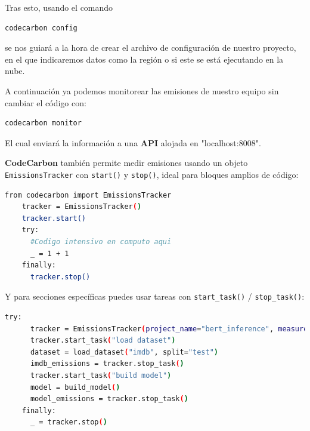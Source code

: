 \documentclass[12pt,a4paper]{report}
\begin{document}
Tras esto, usando el comando

\begin{tcolorbox}[colback=codebackground, colframe=codeborder, boxrule=0.8pt, arc=0mm, boxsep=5pt, left=5pt, right=5pt, top=5pt, bottom=5pt]
  \begin{lstlisting}[language=bash]
    codecarbon config
  \end{lstlisting}
\end{tcolorbox}

se nos guiará a la hora de crear el archivo de configuración de nuestro
proyecto, en el que indicaremos datos como la región o si este se está
ejecutando en la nube.

A continuación ya podemos monitorear las emisiones de nuestro equipo sin
cambiar el código con:

\begin{tcolorbox}[colback=codebackground, colframe=codeborder, boxrule=0.8pt, arc=0mm, boxsep=5pt, left=5pt, right=5pt, top=5pt, bottom=5pt]
  \begin{lstlisting}[language=bash]
    codecarbon monitor
  \end{lstlisting}
\end{tcolorbox}

El cual enviará la información a una \textbf{API} alojada en
"localhost:8008".

\textbf{CodeCarbon} también permite medir emisiones usando un objeto \texttt{EmissionsTracker} con \texttt{start()} y \texttt{stop()}, ideal para bloques amplios de código:

\begin{tcolorbox}[colback=codebackground, colframe=codeborder, boxrule=0.8pt, arc=0mm, boxsep=5pt, left=5pt, right=5pt, top=5pt, bottom=5pt]
  \begin{lstlisting}[language=bash]
    from codecarbon import EmissionsTracker
    tracker = EmissionsTracker()
    tracker.start()
    try:
      #Codigo intensivo en computo aqui
      _ = 1 + 1
    finally:
      tracker.stop()
  \end{lstlisting}
\end{tcolorbox}

Y para secciones específicas puedes usar tareas con \texttt{start\_task()} /
\texttt{stop\_task()}:

\begin{tcolorbox}[colback=codebackground, colframe=codeborder, boxrule=0.8pt, arc=0mm, boxsep=5pt, left=5pt, right=5pt, top=5pt, bottom=5pt]
  \begin{lstlisting}[language=bash]
    try:
      tracker = EmissionsTracker(project_name="bert_inference", measure_power_secs=10)
      tracker.start_task("load dataset")
      dataset = load_dataset("imdb", split="test")
      imdb_emissions = tracker.stop_task()
      tracker.start_task("build model")
      model = build_model()
      model_emissions = tracker.stop_task()
    finally:
      _ = tracker.stop()
  \end{lstlisting}
\end{tcolorbox}
\end{document}
